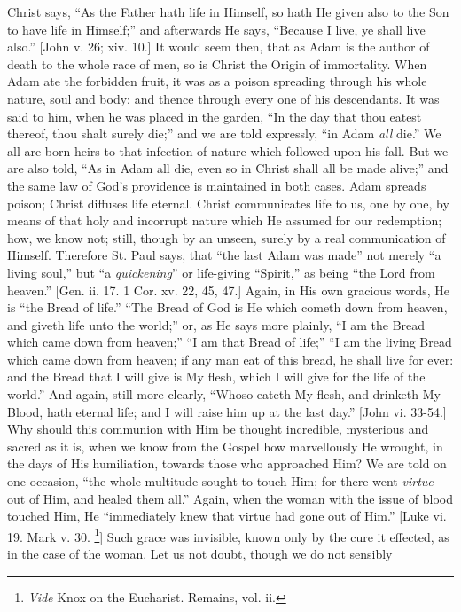 Christ says, ``As the Father hath life in Himself, so hath He
given also to the Son to have life in Himself;'' and afterwards He
says, ``Because I live, ye shall live also.'' [John v. 26; xiv.
10.] It would seem then, that as Adam is the author of death to the
whole race of men, so is Christ the Origin of immortality. When Adam ate
the forbidden fruit, it was as a poison spreading through his whole
nature, soul and body; and thence through every one of his descendants.
It was said to him, when he was placed in the garden, ``In the day
that thou eatest thereof, thou shalt surely die;'' and we are told
expressly, ``in Adam \emph{all} die.'' We all are born heirs to that
infection of nature which followed upon his fall. But we are also told,
``As in Adam all die, even so in Christ shall all be made
alive;'' and the same law of God's providence is maintained in both
cases. Adam spreads poison; Christ diffuses life eternal. Christ
communicates life to us, one by one, by means of that holy and incorrupt
nature which He assumed for our redemption; how, we know not; still,
though by an unseen, surely by a real communication of Himself.
Therefore St. Paul says, that ``the last Adam was made'' not
merely ``a living soul,'' but ``a \emph{quickening}'' or
life-giving ``Spirit,'' as being ``the Lord from
heaven.'' [Gen. ii. 17. 1 Cor. xv. 22, 45, 47.] Again, in His own
gracious words, He is ``the Bread of life.'' ``The Bread of God is
He which cometh down from heaven, and giveth life unto the world;''
or, as He says more plainly, ``I am the Bread which came down from
heaven;'' ``I am that Bread of life;'' ``I am the living
Bread which came down from heaven; if any man eat of this bread, he
shall live for ever: and the Bread that I will give is My flesh, which I
will give for the life of the world.'' And again, still more
clearly, ``Whoso eateth My flesh, and drinketh My Blood, hath
eternal life; and I will raise him up at the last day.'' [John vi.
33-54.] Why should this communion with Him be thought incredible,
mysterious and sacred as it is, when we know from the Gospel how
marvellously He wrought, in the days of His humiliation, towards those
who approached Him? We are told on one occasion, ``the whole
multitude sought to touch Him; for there went \emph{virtue} out of Him,
and healed them all.'' Again, when the woman with the issue of blood
touched Him, He ``immediately knew that virtue had gone out of
Him.'' [Luke vi. 19. Mark v. 30. \footnote{\emph{Vide} Knox on the Eucharist. Remains,
vol. ii.}] Such grace was invisible, known only by the cure it effected, as
in the case of the woman. Let us not doubt, though we do not sensibly
